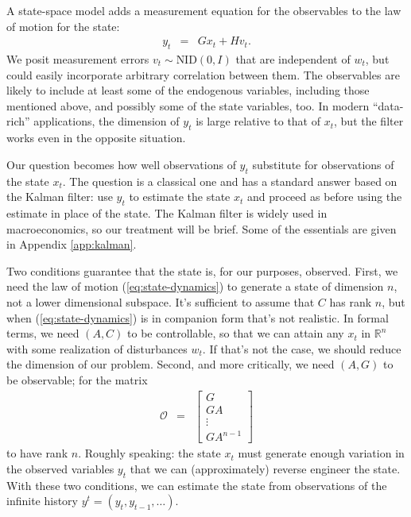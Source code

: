 \documentclass[12pt]{article}
\begin{document}
{A state-space model adds a measurement equation for the observables
 to the law of motion for the state:
\begin{eqnarray}
    y_t &=& G x_t + H v_t .
        \label{eq:meas}
\end{eqnarray}
We posit measurement errors $v_t \sim \mbox{NID}(0,I)$ that are independent of $w_t$,
but could easily incorporate arbitrary correlation between them.
The observables are likely to include at least some of the endogenous
variables, including those mentioned above,
and possibly some of the state variables, too.
In modern ``data-rich'' applications, the dimension of $y_t$ is large
relative to that of $x_t$,
but the filter works even in the opposite situation.

Our question becomes how well observations
of $y_t$ substitute for observations of the state $x_t$.
The question is a classical one and has a standard answer
based on the Kalman filter:
use $y_t$ to estimate the state $x_t$ and proceed as before
using the estimate in place of the state.
The Kalman filter is widely used in macroeconomics,
so our treatment will be brief.
Some of the essentials are given in Appendix \ref{app:kalman}.

Two conditions guarantee that the state is, for our purposes, observed.
First, we need the law of motion (\ref{eq:state-dynamics})
to generate a state of dimension $n$, not a lower dimensional subspace.
It's sufficient to assume that $C$ has rank $n$,
but when (\ref{eq:state-dynamics}) is in companion form that's not realistic.
In formal terms, we need $(A,C)$ to be controllable,
so that we can attain any $x_t$ in $\mathbb{R}^n$ with some realization of disturbances $w_t$.
If that's not the case, we should reduce the dimension of our problem.
Second, and more critically, we need $(A,G)$ to be observable;
for the matrix
\begin{eqnarray*}
    \mathcal{O} &=&
    \left[
    \begin{array}{c}
        G \\ G  A  \\ \vdots \\ G  A ^{n-1}
    \end{array}
    \right]
\end{eqnarray*}
to have rank $n$.
Roughly speaking: the state $x_t$ must generate enough variation in the observed variables $y_t$
that we can (approximately) reverse engineer the state.
With these two conditions, we can estimate the state
from observations of the infinite history $y^t = (y_t, y_{t-1}, \ldots)$.

}
\end{document}
